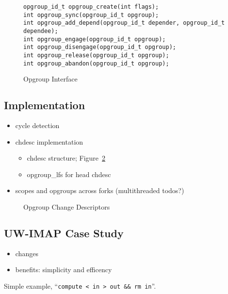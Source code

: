 \begin{figure}[htb]
\begin{small}
\texttt{opgroup\_id\_t opgroup\_create(int flags);}\\
\texttt{int opgroup\_sync(opgroup\_id\_t opgroup);}\\
\texttt{int opgroup\_add\_depend(opgroup\_id\_t depender, opgroup\_id\_t dependee);}\\
\texttt{int opgroup\_engage(opgroup\_id\_t opgroup);}\\
\texttt{int opgroup\_disengage(opgroup\_id\_t opgroup);}\\
\texttt{int opgroup\_release(opgroup\_id\_t opgroup);}\\
\texttt{int opgroup\_abandon(opgroup\_id\_t opgroup);}
\end{small}
\caption{\label{fig:opgroup-interface} Opgroup Interface}
\end{figure}

\subsection{Implementation}
\begin{itemize}
\item cycle detection
\item chdesc implementation
  \begin{itemize}
  \item chdesc structure; Figure~\ref{fig:opgroup-chdescs}
  \item opgroup\_lfs for head chdesc
  \end{itemize}
\item scopes and opgroups across forks (multithreaded todos?)
\end{itemize}

\begin{figure}[htb]
\caption{\label{fig:opgroup-chdescs} Opgroup Change Descriptors}
\end{figure}
\subsection{UW-IMAP Case Study}
\begin{itemize}
\item changes
\item benefits: simplicity and efficency
\end{itemize}

Simple example, ``\texttt{compute < in > out \&\& rm in}''.
